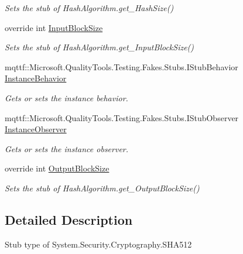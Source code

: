 \begin{DoxyCompactItemize}
\begin{DoxyCompactList}\small\item\em Sets the stub of Hash\-Algorithm.\-get\-\_\-\-Hash\-Size()\end{DoxyCompactList}\item 
override int \hyperlink{class_system_1_1_security_1_1_cryptography_1_1_fakes_1_1_stub_s_h_a512_a524606f437de3fef9351b254d78bc391}{Input\-Block\-Size}
\begin{DoxyCompactList}\small\item\em Sets the stub of Hash\-Algorithm.\-get\-\_\-\-Input\-Block\-Size()\end{DoxyCompactList}\item 
mqttf\-::\-Microsoft.\-Quality\-Tools.\-Testing.\-Fakes.\-Stubs.\-I\-Stub\-Behavior \hyperlink{class_system_1_1_security_1_1_cryptography_1_1_fakes_1_1_stub_s_h_a512_a27bf8d3e5898aca13a1c6c18eff83a34}{Instance\-Behavior}
\begin{DoxyCompactList}\small\item\em Gets or sets the instance behavior.\end{DoxyCompactList}\item 
mqttf\-::\-Microsoft.\-Quality\-Tools.\-Testing.\-Fakes.\-Stubs.\-I\-Stub\-Observer \hyperlink{class_system_1_1_security_1_1_cryptography_1_1_fakes_1_1_stub_s_h_a512_a46d51e3756ecaeb9dbfb2c8e83675c12}{Instance\-Observer}
\begin{DoxyCompactList}\small\item\em Gets or sets the instance observer.\end{DoxyCompactList}\item 
override int \hyperlink{class_system_1_1_security_1_1_cryptography_1_1_fakes_1_1_stub_s_h_a512_a41461ad7cfa4e9b62a0303d1bcdd9a17}{Output\-Block\-Size}
\begin{DoxyCompactList}\small\item\em Sets the stub of Hash\-Algorithm.\-get\-\_\-\-Output\-Block\-Size()\end{DoxyCompactList}\end{DoxyCompactItemize}


\subsection{Detailed Description}
Stub type of System.\-Security.\-Cryptography.\-S\-H\-A512



